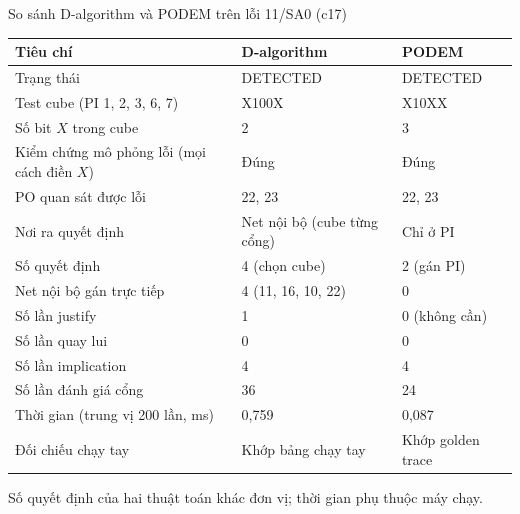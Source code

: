 \begin{frame}{So sánh D-algorithm và PODEM trên lỗi 11/SA0 (c17)}
\centering\scriptsize
\renewcommand{\arraystretch}{1.05}
\begin{tabular}{@{}p{}p{}p{}@{}}
\toprule
\textbf{Tiêu chí} & \textbf{D-algorithm} & \textbf{PODEM}\\
\midrule
Trạng thái & DETECTED & DETECTED\\
Test cube (PI 1, 2, 3, 6, 7) & X100X & X10XX\\
Số bit $X$ trong cube & 2 & 3\\
Kiểm chứng mô phỏng lỗi (mọi cách điền $X$) & Đúng & Đúng\\
PO quan sát được lỗi & 22, 23 & 22, 23\\
\midrule
Nơi ra quyết định & Net nội bộ (cube từng cổng) & Chỉ ở PI\\
Số quyết định & 4 (chọn cube) & 2 (gán PI)\\
Net nội bộ gán trực tiếp & 4 (11, 16, 10, 22) & 0\\
Số lần justify & 1 & 0 (không cần)\\
Số lần quay lui & 0 & 0\\
\midrule
Số lần implication & 4 & 4\\
Số lần đánh giá cổng & 36 & 24\\
Thời gian (trung vị 200 lần, ms) & 0,759 & 0,087\\
\midrule
Đối chiếu chạy tay & Khớp bảng chạy tay & Khớp golden trace\\
\bottomrule
\end{tabular}

\vspace{1mm}
{\scriptsize Số quyết định của hai thuật toán khác đơn vị; thời gian phụ thuộc máy chạy.}
\end{frame}
